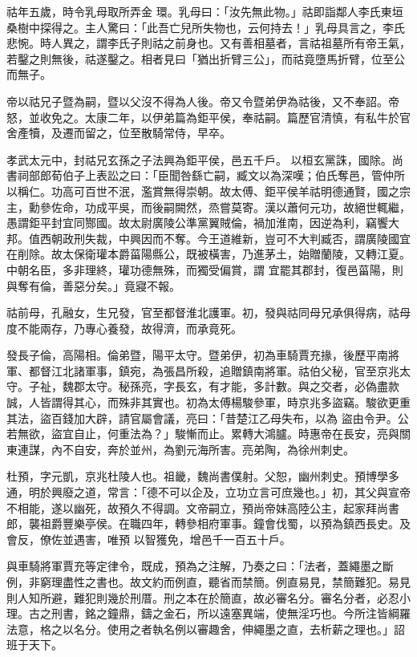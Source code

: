 \begin{pinyinscope}
 祜年五歲，時令乳母取所弄金
 環。乳母曰：「汝先無此物。」祜即詣鄰人李氏東垣桑樹中探得之。主人驚曰：「此吾亡兒所失物也，云何持去！」乳母具言之，李氏悲惋。時人異之，謂李氏子則祜之前身也。又有善相墓者，言祜祖墓所有帝王氣，若鑿之則無後，祜遂鑿之。相者見曰「猶出折臂三公」，而祜竟墮馬折臂，位至公而無子。



 帝以祜兄子暨為嗣，暨以父沒不得為人後。帝又令暨弟伊為祜後，又不奉詔。帝怒，並收免之。太康二年，以伊弟篇為鉅平侯，奉祜嗣。篇歷官清慎，有私牛於官舍產犢，及遷而留之，位至散騎常侍，早卒。



 孝武太元中，封祜兄玄孫之子法興為鉅平侯，邑五千戶。
 以桓玄黨誅，國除。尚書祠部郎荀伯子上表訟之曰：「臣聞咎繇亡嗣，臧文以為深嘆；伯氏奪邑，管仲所以稱仁。功高可百世不泯，濫賞無得崇朝。故太傅、鉅平侯羊祜明德通賢，國之宗主，勳參佐命，功成平吳，而後嗣闕然，烝嘗莫寄。漢以蕭何元功，故絕世輒繼，愚謂鉅平封宜同酂國。故太尉廣陵公準黨翼賊倫，禍加淮南，因逆為利，竊饗大邦。值西朝政刑失裁，中興因而不奪。今王道維新，豈可不大判臧否，謂廣陵國宜在削除。故太保衛瓘本爵菑陽縣公，既被橫害，乃進茅土，始贈蘭陵，又轉江夏。中朝名臣，多非理終，瓘功德無殊，而獨受偏賞，謂
 宜罷其郡封，復邑菑陽，則與奪有倫，善惡分矣。」竟寢不報。



 祜前母，孔融女，生兄發，官至都督淮北護軍。初，發與祜同母兄承俱得病，祜母度不能兩存，乃專心養發，故得濟，而承竟死。



 發長子倫，高陽相。倫弟暨，陽平太守。暨弟伊，初為車騎賈充掾，後歷平南將軍、都督江北諸軍事，鎮宛，為張昌所殺，追贈鎮南將軍。祜伯父秘，官至京兆太守。子祉，魏郡太守。秘孫亮，字長玄，有才能，多計數。與之交者，必偽盡款誠，人皆謂得其心，而殊非其實也。初為太傅楊駿參軍，時京兆多盜竊。駿欲更重其法，盜百錢加大辟，請官屬會議，亮曰：「昔楚江乙母失布，以為
 盜由令尹。公若無欲，盜宜自止，何重法為？」駿慚而止。累轉大鴻臚。時惠帝在長安，亮與關東連謀，內不自安，奔於並州，為劉元海所害。亮弟陶，為徐州刺史。



 杜預，字元凱，京兆杜陵人也。祖畿，魏尚書僕射。父恕，幽州刺史。預博學多通，明於興廢之道，常言：「德不可以企及，立功立言可庶幾也。」初，其父與宣帝不相能，遂以幽死，故預久不得調。文帝嗣立，預尚帝妹高陸公主，起家拜尚書郎，襲祖爵豐樂亭侯。在職四年，轉參相府軍事。鐘會伐蜀，以預為鎮西長史。及會反，僚佐並遇害，唯預
 以智獲免，增邑千一百五十戶。



 與車騎將軍賈充等定律令，既成，預為之注解，乃奏之曰：「法者，蓋繩墨之斷例，非窮理盡性之書也。故文約而例直，聽省而禁簡。例直易見，禁簡難犯。易見則人知所避，難犯則幾於刑厝。刑之本在於簡直，故必審名分。審名分者，必忍小理。古之刑書，銘之鐘鼎，鑄之金石，所以遠塞異端，使無淫巧也。今所注皆綱羅法意，格之以名分。使用之者執名例以審趣舍，伸繩墨之直，去析薪之理也。」詔班于天下。




\end{pinyinscope}
